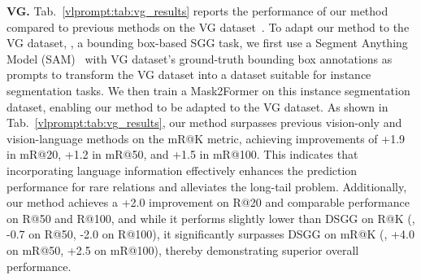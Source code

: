 \noindent \textbf{VG.}
Tab.~\ref{vlprompt:tab:vg_results} reports the performance of our method compared to previous methods on the VG dataset~\citep{krishna2017visual}.
To adapt our method to the VG dataset, \ie, a bounding box-based SGG task, we first use a Segment Anything Model (SAM)~\citep{kirillov2023segment} with VG dataset's ground-truth bounding box annotations as prompts to transform the VG dataset into a dataset suitable for instance segmentation tasks.
We then train a Mask2Former on this instance segmentation dataset, enabling our method to be adapted to the VG dataset.
As shown in Tab.~\ref{vlprompt:tab:vg_results}, our method surpasses previous vision-only and vision-language methods on the mR@K metric, achieving improvements of +1.9 in mR@20, +1.2 in mR@50, and +1.5 in mR@100.
This indicates that incorporating language information effectively enhances the prediction performance for rare relations and alleviates the long-tail problem.
Additionally, our method achieves a +2.0 improvement on R@20 and comparable performance on R@50 and R@100, and while it performs slightly lower than DSGG on R@K (\eg, -0.7 on R@50, -2.0 on R@100), it significantly surpasses DSGG on mR@K (\eg, +4.0 on mR@50, +2.5 on mR@100), thereby demonstrating superior overall performance.

